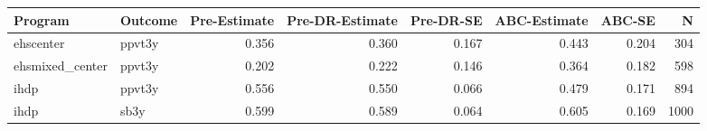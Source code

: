 \begin{table}[ht]
\centering
\begin{tabular}{llrrrrrr}
  \hline
Program & Outcome & Pre-Estimate & Pre-DR-Estimate & Pre-DR-SE & ABC-Estimate & ABC-SE & N \\ 
  \hline
ehscenter & ppvt3y & 0.356 & 0.360 & 0.167 & 0.443 & 0.204 & 304 \\ 
  ehsmixed\_center & ppvt3y & 0.202 & 0.222 & 0.146 & 0.364 & 0.182 & 598 \\ 
  ihdp & ppvt3y & 0.556 & 0.550 & 0.066 & 0.479 & 0.171 & 894 \\ 
  ihdp & sb3y & 0.599 & 0.589 & 0.064 & 0.605 & 0.169 & 1000 \\ 
   \hline
\end{tabular}
\end{table}

